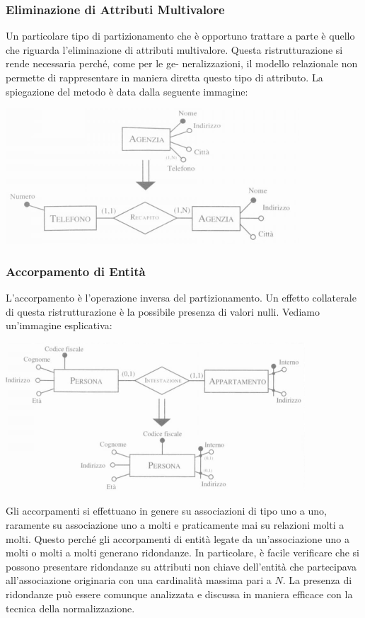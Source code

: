 \documentclass[a4paper,12pt, oneside]{book}
\begin{document}
\subsubsection{Eliminazione di Attributi Multivalore}
Un particolare tipo di partizionamento che è opportuno trattare a parte è quello che riguarda l'eliminazione di attributi
multivalore. Questa ristrutturazione si rende necessaria perché, come per le ge-
neralizzazioni, il modello relazionale non permette di rappresentare in maniera
diretta questo tipo di attributo. La spiegazione del metodo è data dalla seguente immagine:
\begin{center}
\includegraphics[scale=1]{img/conc2.png}
\end{center}
\subsubsection{Accorpamento di Entità}
L'accorpamento è l'operazione inversa del partizionamento.
Un effetto collaterale di questa ristrutturazione è la possibile presenza di valori nulli. Vediamo un'immagine esplicativa:
\begin{center}
\includegraphics[scale=1]{img/conc3.png}
\end{center}
Gli accorpamenti si effettuano in genere su associazioni di tipo uno a uno,
raramente su associazione uno a molti e praticamente mai su relazioni molti a
molti. Questo perché gli accorpamenti di entità legate da un'associazione uno a
molti o molti a molti generano ridondanze. In particolare, è facile verificare che si
possono presentare ridondanze su attributi non chiave dell'entità che partecipava
all'associazione originaria con una cardinalità massima pari a $N$. La presenza di
ridondanze può essere comunque analizzata e discussa in maniera efficace con la
tecnica della normalizzazione.
\end{document}
